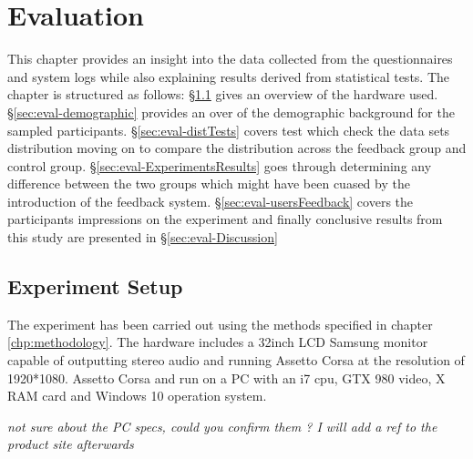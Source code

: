 \chapter{Evaluation}
\label{eval}
\label{chp:evaluation}

This chapter provides an insight into the data collected from the questionnaires and \methodname system logs while also explaining results derived from statistical tests. The chapter is structured as follows: \S\ref{sec:eval-experiment} gives an overview of the hardware used. \S\ref{sec:eval-demographic} provides an over of the demographic background for the sampled participants. \S\ref{sec:eval-distTests} covers test which check the data sets distribution moving on to compare the distribution across the feedback group and control group. \S\ref{sec:eval-ExperimentsResults} goes through determining any difference between the two groups which might have been cuased by the introduction of the feedback system. \S\ref{sec:eval-usersFeedback} covers the participants impressions on the experiment and finally conclusive results from this study are presented in \S\ref{sec:eval-Discussion} 

\section{Experiment Setup}
\label{sec:eval-experiment}

The experiment has been carried out using the methods specified in chapter \ref{chp:methodology}. The hardware includes a 32inch LCD Samsung monitor capable of outputting stereo audio and running Assetto Corsa at the resolution of 1920*1080. Assetto Corsa and \methodname run on a PC with an i7 cpu, GTX 980 video, X RAM card and Windows 10 operation system.

\emph{not sure about the PC specs, could you confirm them ? I will add a ref to the product site afterwards}

